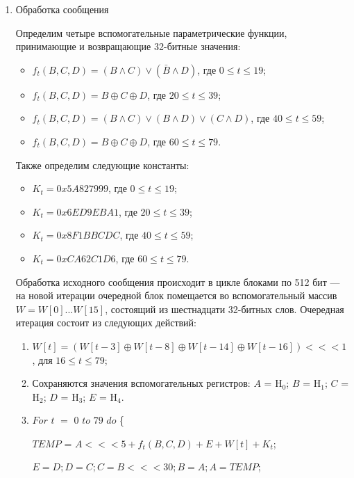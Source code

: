 \documentclass{./civarticle}
\begin{document}
\begin{enumerate}
    \item Обработка сообщения

    Определим четыре вспомогательные параметрические функции, принимающие и возвращающие 32-битные значения:

    \begin{itemize}
        \item $f_t(B, C, D) = (B \wedge C) \vee (\bar B \wedge D)$, где $0 \leq t \leq 19$;
        \item $f_t(B, C, D) = B \oplus C \oplus D$, где $20 \leq t \leq 39$;
        \item $f_t(B, C, D) = (B \wedge C) \vee (B \wedge D) \vee (C \wedge D)$, где $40 \leq t \leq 59$;
        \item $f_t(B, C, D) = B \oplus C \oplus D$, где $60 \leq t \leq 79$.
    \end{itemize}

    Также определим следующие константы:
    \begin{itemize}
        \item $K_t = 0x5A827999$, где $0 \leq t \leq 19$;
        \item $K_t = 0x6ED9EBA1$, где $20 \leq t \leq 39$;
        \item $K_t = 0x8F1BBCDC$, где $40 \leq t \leq 59$;
        \item $K_t = 0xCA62C1D6$, где $60 \leq t \leq 79$.
    \end{itemize}

    Обработка исходного сообщения происходит в цикле блоками по 512 бит --- на новой итерации очередной блок помещается во вспомогательный массив $W = W[0] ... W[15]$, состоящий из шестнадцати 32-битных слов. Очередная итерация состоит из следующих действий:

    \begin{enumerate}
        \item $W[t] = (W[t-3] \oplus W[t-8] \oplus W[t-14] \oplus W[t-16]) <<< 1$, для $16 \leq t \leq 79$;
        \item Сохраняются значения вспомогательных регистров: $A$ = H$_0$; $B$ = H$_1$; $C$ = H$_2$; $D$ = H$_3$; $E$ = H$_4$.
        \item $For$ $t$ $=$ $0$ $to$ $79$ $do$ \{ 

        \hspace{0.5cm} $TEMP$ = $A <<< 5 + f_t(B, C, D) + E + W[t] + K_t$;

        \hspace{0.5cm} $E = D; D = C; C = B <<< 30; B = A; A = TEMP$;
    

\end{enumerate}
\end{enumerate}
\end{document}
